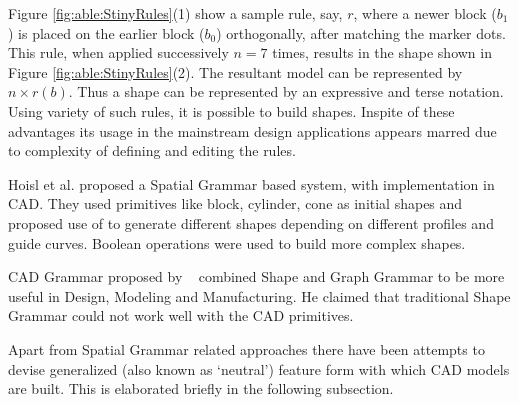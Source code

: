 
	
Figure \ref{fig:able:StinyRules}(1) show a sample rule, say, $r$, where a newer block ($b_1$) is placed on the earlier block  ($b_0$) orthogonally, after matching the marker dots. This rule, when applied successively $n=7$ times, results in the shape shown in Figure \ref{fig:able:StinyRules}(2). The resultant model can be represented by $n \times r(b)$. Thus a shape can be represented by an expressive and terse notation. Using variety of such rules, it is possible to build shapes. Inspite of these advantages its usage in the mainstream design applications appears marred due to complexity of defining and editing the rules.

Hoisl et al.\cite{Hoisl2009} proposed a Spatial Grammar based system, with implementation in CAD. They used primitives like block, cylinder, cone as initial shapes and proposed use of  to generate different shapes depending on different profiles and guide curves. Boolean operations were used to build more complex shapes. 

CAD Grammar proposed by ~\cite{Deak2006} combined Shape and Graph Grammar to be more useful in Design, Modeling and Manufacturing. He claimed that traditional Shape Grammar could not work well with the CAD primitives.


Apart from Spatial Grammar related approaches there have been attempts to devise generalized (also known as `neutral') feature form with which CAD models are built. This is elaborated briefly in the following subsection. %


%


